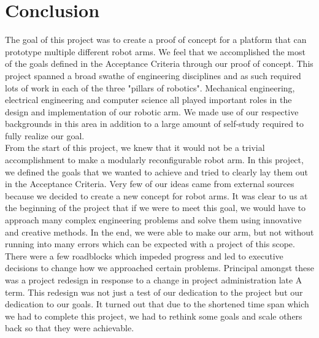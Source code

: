 \section{Conclusion}

The goal of this project was to create a proof of concept for a platform that can prototype multiple different robot arms. We feel that we accomplished the most of the goals defined in the Acceptance Criteria through our proof of concept. This project spanned a broad swathe of engineering disciplines and as such required lots of work in each of the three "pillars of robotics". Mechanical engineering, electrical engineering and computer science all played important roles in the design and implementation of our robotic arm. We made use of our respective backgrounds in this area in addition to a large amount of self-study required to fully realize our goal. \\
\newline
\noindent From the start of this project, we knew that it would not be a trivial accomplishment to make a modularly reconfigurable robot arm. In this project, we defined the goals that we wanted to achieve and tried to clearly lay them out in the Acceptance Criteria. Very few of our ideas came from external sources because we decided to create a new concept for robot arms. It was clear to us at the beginning of the project that if we were to meet this goal, we would have to approach many complex engineering problems and solve them using innovative and creative methods. In the end, we were able to make our arm, but not without running into many errors which can be expected with a project of this scope. There were a few roadblocks which impeded progress and led to executive decisions to change how we approached certain problems. Principal amongst these was a project redesign in response to a change in project administration late A term. This redesign was not just a test of our dedication to the project but our dedication to our goals. It turned out that due to the shortened time span which we had to complete this project, we had to rethink some goals and scale others back so that they were achievable. \\
\newline
